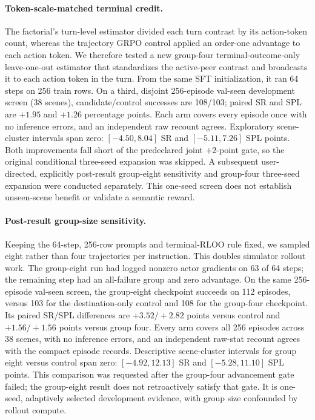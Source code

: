 \documentclass[10pt,twocolumn,letterpaper]{article}
\begin{document}
\paragraph{Token-scale-matched terminal credit.} The factorial's
turn-level estimator divided each turn contrast by its action-token
count, whereas the trajectory GRPO control applied an order-one
advantage to each action token. We therefore tested a new group-four
terminal-outcome-only leave-one-out estimator that standardizes the
active-peer contrast and broadcasts it to each action token in the
turn. From the same SFT initialization, it ran 64 steps on 256 train
rows. On a third, disjoint 256-episode val-seen development screen
(38 scenes), candidate/control successes are 108/103; paired SR and
SPL are $+1.95$ and $+1.26$ percentage points. Each arm covers every
episode once with no inference errors, and an independent raw recount
agrees. Exploratory scene-cluster intervals span zero: $[-4.50,8.04]$
SR and $[-5.11,7.26]$ SPL points. Both improvements fall short of the
predeclared joint $+2$-point gate, so the original conditional
three-seed expansion was skipped. A subsequent user-directed, explicitly
post-result group-eight sensitivity and group-four three-seed expansion
were conducted separately. This one-seed screen does not establish
unseen-scene benefit or validate a semantic reward.

\paragraph{Post-result group-size sensitivity.} Keeping the 64-step,
256-row prompts and terminal-RLOO rule fixed, we sampled eight rather
than four trajectories per instruction. This doubles simulator rollout
work. The group-eight run had logged nonzero actor gradients on 63 of
64 steps; the remaining step had an all-failure group and zero
advantage. On the same 256-episode val-seen screen, the group-eight
checkpoint succeeds on 112 episodes, versus 103 for the destination-only
control and 108 for the group-four checkpoint. Its paired SR/SPL
differences are $+3.52/+2.82$ points versus control and $+1.56/+1.56$
points versus group four. Every arm covers all 256 episodes across 38
scenes, with no inference errors, and an independent raw-stat recount
agrees with the compact episode records. Descriptive scene-cluster
intervals for group eight versus control span zero: $[-4.92,12.13]$
SR and $[-5.28,11.10]$ SPL points. This comparison was requested after
the group-four advancement gate failed; the group-eight result does not
retroactively satisfy that gate. It is one-seed, adaptively selected
development evidence, with group size confounded by rollout compute.
\end{document}
